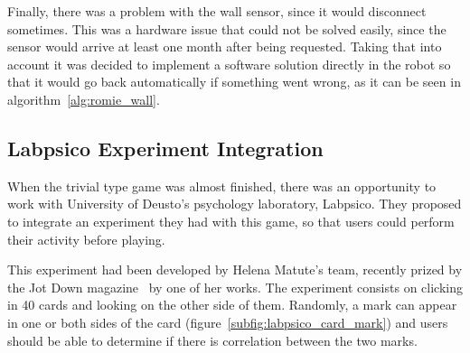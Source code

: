 Finally, there was a problem with the wall sensor, since it would disconnect sometimes. This was a
hardware issue that could not be solved easily, since the sensor would arrive at least one month
after being requested. Taking that into account it was decided to implement a software solution
directly in the robot so that it would go back automatically if something went wrong, as it can be
seen in algorithm~\ref{alg:romie_wall}.

\subsection{Labpsico Experiment Integration}

When the trivial type game was almost finished, there was an opportunity to work with University of
Deusto's psychology laboratory, Labpsico. They proposed to integrate an experiment they had with
this game, so that users could perform their activity before playing.

This experiment had been developed by Helena Matute's team, recently prized by the Jot Down
magazine~\cite{jotdown_helena} by one of her works. The experiment consists on clicking in 40 cards
and looking on the other side of them. Randomly, a mark can appear in one or both sides of the card
(figure~\ref{subfig:labpsico_card_mark}) and users should be able to determine if there is
correlation between the two marks.

